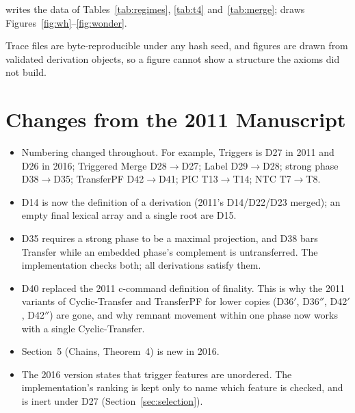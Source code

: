 \documentclass[11pt]{article}
\newcommand{\code}[1]{\texttt{\detokenize{#1}}}
\newcommand{\Def}[1]{D#1}
\newcommand{\Thm}[1]{T#1}
\theoremstyle{definition}
\theoremstyle{plain}
\begin{document}
\noindent
\code{tables.py} writes the data of Tables~\ref{tab:regimes},
\ref{tab:t4} and~\ref{tab:merge}; \code{figures.py} draws
Figures~\ref{fig:wh}--\ref{fig:wonder}.

\noindent
Trace files are byte-reproducible under any hash seed, and figures are drawn
from validated derivation objects, so a figure cannot show a structure the
axioms did not build.




\appendix
\section{Changes from the 2011 Manuscript}
\label{app:2011}

\begin{itemize}[leftmargin=*,itemsep=2pt]
\item Numbering changed throughout. For example, Triggers is \Def{27} in 2011
  and \Def{26} in 2016; Triggered Merge \Def{28}$\to$\Def{27}; Label
  \Def{29}$\to$\Def{28}; strong phase \Def{38}$\to$\Def{35}; TransferPF
  \Def{42}$\to$\Def{41}; PIC \Thm{13}$\to$\Thm{14}; NTC \Thm{7}$\to$\Thm{8}.
\item \Def{14} is now the definition of a derivation (2011's
  \Def{14}/\Def{22}/\Def{23} merged); an empty final lexical array and a
  single root are \Def{15}.
\item \Def{35} requires a strong phase to be a maximal projection, and
  \Def{38} bars Transfer while an embedded phase's complement is
  untransferred. The implementation checks both; all derivations satisfy
  them.
\item \Def{40} replaced the 2011 c-command definition of finality. This is
  why the 2011 variants of Cyclic-Transfer and TransferPF for lower copies
  (\Def{36}$'$, \Def{36}$''$, \Def{42}$'$, \Def{42}$''$) are gone, and why
  remnant movement within one phase now works with a single Cyclic-Transfer.
\item Section~5 (Chains, Theorem~4) is new in 2016.
\item The 2016 version states that trigger features are unordered. The
  implementation's ranking is kept only to name which feature is checked,
  and is inert under \Def{27} (Section~\ref{sec:selection}).
\end{itemize}
\end{document}
